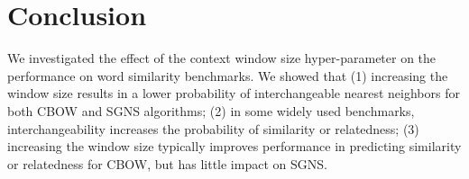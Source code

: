 \documentclass[11pt,a4paper]{article}
\begin{document}
    
    

\section{Conclusion}\label{sec:conclusion}

    We investigated the effect of the context window size hyper-parameter
    on the performance on word similarity benchmarks.
    We showed that
    (1) increasing the window size results in a lower probability of interchangeable
    nearest neighbors for both CBOW and SGNS algorithms;
    (2) in some widely used benchmarks,
    interchangeability increases the probability of similarity or relatedness;
    (3) increasing the window size typically improves performance
    in predicting similarity or relatedness for CBOW,
    but has little impact on SGNS.
    
\end{document}
